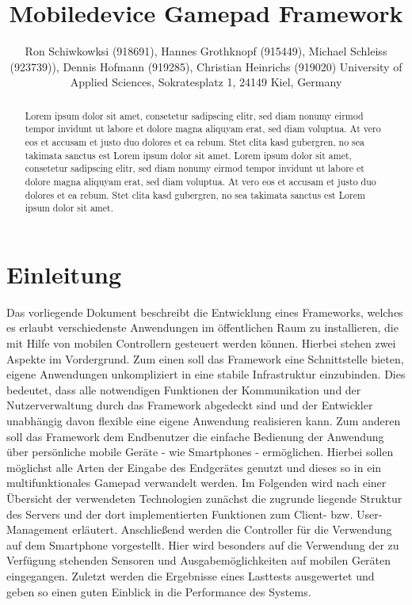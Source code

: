 \documentclass[a4paper]{spie}  %
\title{Mobiledevice Gamepad Framework} %
\author{ Ron Schiwkowksi  (918691), Hannes Grothknopf (915449), Michael Schleiss (923739)), Dennis Hofmann (919285), Christian Heinrichs (919020)
\skiplinehalf
University of Applied Sciences, Sokratesplatz 1, 24149 Kiel, Germany
}
\begin{document}
 
  \maketitle 
\begin{abstract} %
Lorem ipsum dolor sit amet, consetetur sadipscing elitr, sed diam nonumy eirmod tempor invidunt ut labore et dolore magna aliquyam erat, sed diam voluptua. At vero eos et accusam et justo duo dolores et ea rebum. Stet clita kasd gubergren, no sea takimata sanctus est Lorem ipsum dolor sit amet. Lorem ipsum dolor sit amet, consetetur sadipscing elitr, sed diam nonumy eirmod tempor invidunt ut labore et dolore magna aliquyam erat, sed diam voluptua. At vero eos et accusam et justo duo dolores et ea rebum. Stet clita kasd gubergren, no sea takimata sanctus est Lorem ipsum dolor sit amet.
\end{abstract}


\section{Einleitung} %
Das vorliegende Dokument beschreibt die Entwicklung eines Frameworks, welches es erlaubt verschiedenste Anwendungen im öffentlichen Raum zu installieren, die mit Hilfe von mobilen Controllern gesteuert werden können. Hierbei stehen zwei Aspekte im Vordergrund. Zum einen soll das Framework eine Schnittstelle bieten, eigene Anwendungen unkompliziert in eine stabile Infrastruktur einzubinden. Dies bedeutet, dass alle notwendigen Funktionen der Kommunikation und der Nutzerverwaltung durch das Framework abgedeckt sind und der Entwickler unabhängig davon flexible eine eigene Anwendung realisieren kann. Zum anderen soll das Framework dem Endbenutzer die einfache Bedienung der Anwendung über persönliche mobile Geräte - wie Smartphones - ermöglichen. Hierbei sollen möglichst alle Arten der Eingabe des Endgerätes genutzt und dieses so in ein multifunktionales Gamepad verwandelt werden.
Im Folgenden wird nach einer Übersicht der verwendeten Technologien zunächst die zugrunde liegende Struktur des Servers und der dort implementierten Funktionen zum Client- bzw. User-Management erläutert. Anschließend werden die Controller für die Verwendung auf dem Smartphone vorgestellt. Hier wird besonders auf die Verwendung der zu Verfügung stehenden Sensoren und Ausgabemöglichkeiten auf mobilen Geräten eingegangen. Zuletzt werden die Ergebnisse eines Lasttests ausgewertet und geben so einen guten Einblick in die Performance des Systems.
\end{document}
